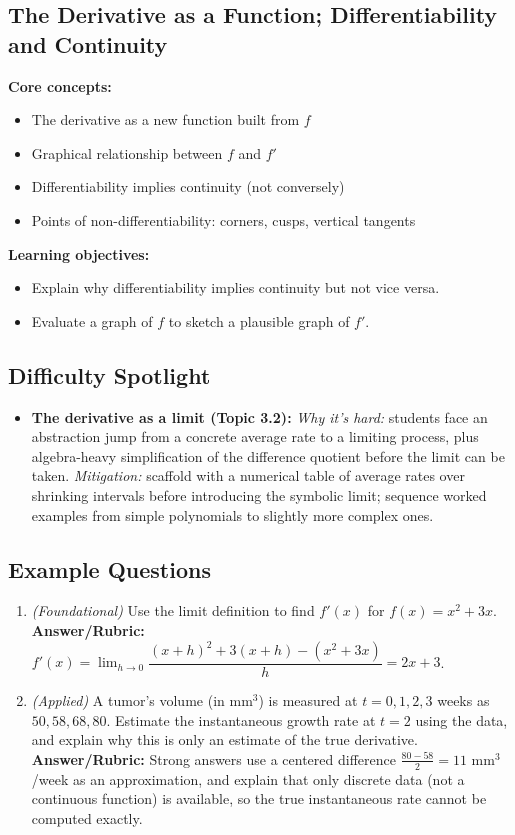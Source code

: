 \documentclass{article}
\begin{document}
\subsection{The Derivative as a Function; Differentiability and Continuity}
\textbf{Core concepts:}
\begin{itemize}[leftmargin=*]
  \item The derivative as a new function built from $f$
  \item Graphical relationship between $f$ and $f'$
  \item Differentiability implies continuity (not conversely)
  \item Points of non-differentiability: corners, cusps, vertical tangents
\end{itemize}
\textbf{Learning objectives:}
\begin{itemize}[leftmargin=*]
  \item Explain why differentiability implies continuity but not vice versa.
  \item Evaluate a graph of $f$ to sketch a plausible graph of $f'$.
\end{itemize}

\subsection*{Difficulty Spotlight}
\begin{itemize}[leftmargin=*]
  \item \textbf{The derivative as a limit (Topic 3.2):} \textit{Why it's hard:} students face an abstraction jump from a concrete average rate to a limiting process, plus algebra-heavy simplification of the difference quotient before the limit can be taken. \textit{Mitigation:} scaffold with a numerical table of average rates over shrinking intervals before introducing the symbolic limit; sequence worked examples from simple polynomials to slightly more complex ones.
\end{itemize}

\subsection*{Example Questions}
\begin{enumerate}[leftmargin=*]
  \item \textit{(Foundational)} Use the limit definition to find $f'(x)$ for $f(x) = x^2 + 3x$. \\
  \textbf{Answer/Rubric:} $f'(x) = \lim_{h\to 0} \dfrac{(x+h)^2+3(x+h) - (x^2+3x)}{h} = 2x+3$.
  \item \textit{(Applied)} A tumor's volume (in mm$^3$) is measured at $t=0,1,2,3$ weeks as $50, 58, 68, 80$. Estimate the instantaneous growth rate at $t=2$ using the data, and explain why this is only an estimate of the true derivative. \\
  \textbf{Answer/Rubric:} Strong answers use a centered difference $\frac{80-58}{2}=11$ mm$^3$/week as an approximation, and explain that only discrete data (not a continuous function) is available, so the true instantaneous rate cannot be computed exactly.
\end{enumerate}
\end{document}
